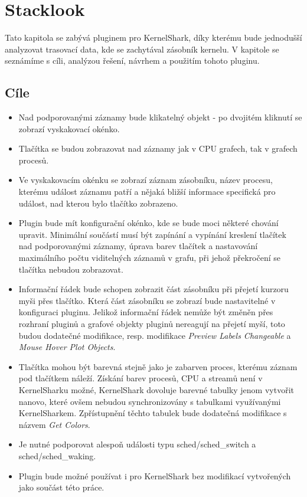 \chapter{Stacklook}
Tato kapitola se zabývá pluginem pro KernelShark, díky kterému bude jednodušší analyzovat trasovací data, kde se zachytával zásobník kernelu. V kapitole se seznámíme s cíli, analýzou řešení, návrhem a použitím tohoto pluginu.

\section{Cíle}

\begin{itemize}
    \item Nad podporovanými záznamy bude klikatelný objekt - po dvojitém kliknutí se zobrazí vyskakovací okénko.
    \item Tlačítka se budou zobrazovat nad záznamy jak v CPU grafech, tak v grafech procesů.
    \item Ve vyskakovacím okénku se zobrazí záznam zásobníku, název procesu, kterému událost záznamu patří a nějaká bližší informace specifická pro událost, nad kterou bylo tlačítko zobrazeno.
    \item Plugin bude mít konfigurační okénko, kde se bude moci některé chování upravit. Minimální součástí musí být zapínání a vypínání kreslení tlačítek nad podporovanými záznamy, úprava barev tlačítek a nastavování maximálního počtu viditelných záznamů v grafu, při jehož překročení se tlačítka nebudou zobrazovat.
    \item Informační řádek bude schopen zobrazit část zásobníku při přejetí kurzoru myši přes tlačítko. Která část zásobníku se zobrazí bude nastavitelné v konfiguraci pluginu. Jelikož informační řádek nemůže být změněn přes rozhraní pluginů a grafové objekty pluginů nereagují na přejetí myší, toto budou dodatečné modifikace, resp. modifikace \emph{Preview Labels Changeable} a \emph{Mouse Hover Plot Objects}.
    \item Tlačítka mohou být barevná stejně jako je zabarven proces, kterému záznam pod tlačítkem náleží. Získání barev procesů, CPU a streamů není v KernelSharku možné, KernelShark dovoluje barevné tabulky jenom vytvořit nanovo, které ovšem nebudou synchronizovány s tabulkami využívanými KernelSharkem. Zpřístupnění těchto tabulek bude dodatečná modifikace s názvem \emph{Get Colors}.
    \item Je nutné podporovat alespoň události typu sched/sched\_switch a sched/sched\_waking.
    \item Plugin bude možné používat i pro KernelShark bez modifikací vytvořených jako součást této práce.
\end{itemize}

